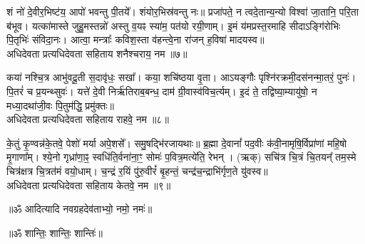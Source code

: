 शं नो॑ दे॒वीर॒भिष्ट॑य॒ आपो॑ भवन्तु पी॒तये᳚। शंयोर॒भिस्र॑वन्तु नः॥ प्रजा॑पते॒ न त्वदे॒तान्य॒न्यो विश्वा॑ जा॒तानि॒ परि॒ता ब॑भूव। यत्का॑मास्ते जुहु॒मस्तन्नो॑ अस्तु व॒यꣴ स्या॑म॒ पत॑यो रयी॒णाम्। इ॒मं य॑मप्रस्त॒रमाहि सीदाऽङ्गि॑रोभिः पि॒तृभिः॑ संविदा॒नः। आत्वा॒ मन्त्राः᳚ कविश॒स्ता व॑हन्त्वे॒ना रा॑जन् ह॒विषा॑ मादयस्व॥ \\
अधिदेवता प्रत्यधिदेवता सहिताय शनैश्चराय॒ नम॥७॥ 

कया॑ नश्चि॒त्र आभु॑वदू॒ती स॒दावृ॑धः॒ सखा᳚। कया॒ शचि॑ष्ठया वृ॒ता। आऽयङ्गौः पृश्नि॑रक्रमी॒दस॑नन्मा॒तरं॒ पुनः॑। पि॒तरं॑ च प्र॒यन्थ्सुवः॑। यत्ते॑ दे॒वी निर्ऋ॑तिराब॒बन्ध॒ दाम॑ ग्री॒वास्व॑विच॒र्त्यम्। इ॒दं  ते॒ तद्विष्या॒म्यायु॑षो॒ न मध्या॒दथा॑जी॒वः पि॒तुम॑द्धि॒ प्रमु॑क्तः॥ \\
अधिदेवता प्रत्यधिदेवता सहिताय राहवे॒ नम॥८॥ 

के॒तुं कृ॒ण्वन्न॑के॒तवे॒ पेशो॑ मर्या अपे॒शसे᳚। समु॒षद्भि॑रजायथाः॥ ब्र॒ह्मा दे॒वानां᳚ पद॒वीः क॑वी॒नामृषि॒र्विप्रा॑णां महि॒षो मृ॒गाणा᳚म्। श्ये॒नो गृध्रा॑णा॒ꣴ॒ स्वधि॑ति॒र्वना॑ना॒ꣳ॒ सोमः॑ प॒वित्र॒मत्ये॑ति॒ रेभन्। (ऋक्) सचि॑त्र चि॒त्रं चि॒तयन्᳚ तम॒स्मे चित्र॑क्षत्र चि॒त्रत॑मं वयो॒धाम्। च॒न्द्रं र॒यिं पु॑रु॒वीरं᳚ बृ॒हन्तं॒ चन्द्र॑च॒न्द्राभि॑र्गृण॒ते यु॑वस्व॥ \\
अधिदेवता प्रत्यधिदेवता सहिताय केतवे॒ नम॥९॥ 

\centerline{॥ॐ आदित्यादि नवग्रहदेव॑ताभ्यो॒ नमो॒ नमः॑॥ }

\centerline{॥ॐ शान्तिः॒ शान्तिः॒ शान्तिः॑॥}